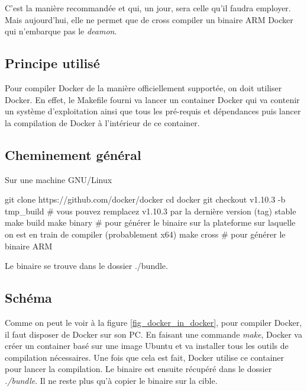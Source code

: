 \documentclass[11pt,a4paper,oneside]{report}
\begin{document}
C'est la manière recommandée et qui, un jour, sera celle qu'il faudra
employer. Mais aujourd'hui, elle ne permet que de cross compiler un
binaire ARM Docker qui n'embarque pas le \emph{deamon}.

\subsection{Principe utilisé}

Pour compiler Docker de la manière officiellement supportée, on doit utiliser Docker. En effet, le Makefile fourni va lancer un container Docker qui va contenir un système d'exploitation ainsi que tous les pré-requis et dépendances puis lancer la compilation de Docker à l'intérieur de ce container.

\subsection{Cheminement général}

Sur une machine GNU/Linux

\begin{bashcode}
git clone https://github.com/docker/docker
cd docker
git checkout v1.10.3 -b tmp_build # vous pouvez remplacez v1.10.3 par la dernière version (tag) stable
make build
make binary # pour générer le binaire sur la plateforme sur laquelle on est en train de compiler (probablement x64)
make cross # pour générer le binaire ARM
\end{bashcode}

Le binaire se trouve dans le dossier ./bundle.

\subsection{Schéma}

Comme on peut le voir à la figure \ref{fig_docker_in_docker}, pour compiler Docker, il faut disposer de Docker sur son PC. En faisant une commande \textit{make}, Docker va créer un container basé sur une image Ubuntu et va installer tous les outils de compilation nécessaires. Une fois que cela est fait, Docker utilise ce container pour lancer la compilation. Le binaire est ensuite récupéré dans le dossier \textit{./bundle}. Il ne reste plus qu'à copier le binaire sur la cible.
\end{document}
